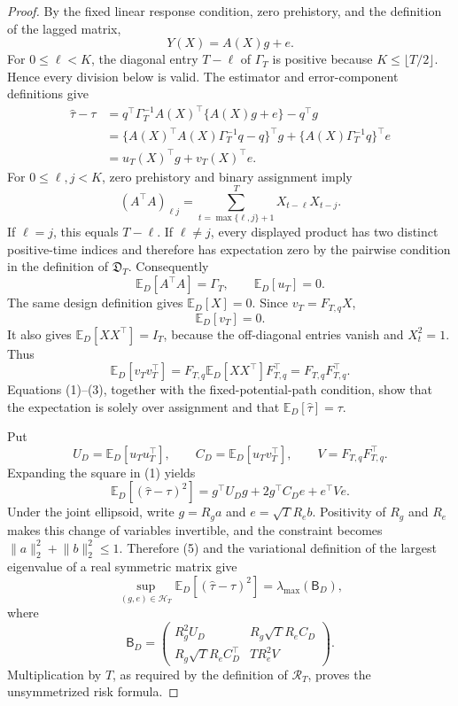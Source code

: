 \documentclass{article}
\begin{document}
\begin{proof}
By the fixed linear response condition, zero prehistory, and the definition of the lagged matrix,
\[
Y(X)=A(X)g+e.
\]
For \(0\le \ell<K\), the diagonal entry \(T-\ell\) of \(\Gamma_T\) is positive because \(K\le\lfloor T/2\rfloor\).  Hence every division below is valid.  The estimator and error-component definitions give
\[
\begin{aligned}
\widehat\tau-\tau
&=q^{\top}\Gamma_T^{-1}A(X)^{\top}\{A(X)g+e\}-q^{\top}g\\
&=\{A(X)^{\top}A(X)\Gamma_T^{-1}q-q\}^{\top}g
  +\{A(X)\Gamma_T^{-1}q\}^{\top}e\\
&=u_T(X)^{\top}g+v_T(X)^{\top}e.
\end{aligned}
\tag{1}
\]
For \(0\le \ell,j<K\), zero prehistory and binary assignment imply
\[
(A^{\top}A)_{\ell j}
=\sum_{t=\max\{\ell,j\}+1}^{T}X_{t-\ell}X_{t-j}.
\]
If \(\ell=j\), this equals \(T-\ell\).  If \(\ell\ne j\), every displayed product has two distinct positive-time indices and therefore has expectation zero by the pairwise condition in the definition of \(\mathfrak D_T\).  Consequently
\[
\mathbb E_D[A^{\top}A]=\Gamma_T,
\qquad
\mathbb E_D[u_T]=0.
\tag{2}
\]
The same design definition gives \(\mathbb E_D[X]=0\).  Since \(v_T=F_{T,q}X\),
\[
\mathbb E_D[v_T]=0.
\tag{3}
\]
It also gives \(\mathbb E_D[XX^{\top}]=I_T\), because the off-diagonal entries vanish and \(X_t^2=1\).  Thus
\[
\mathbb E_D[v_Tv_T^{\top}]
=F_{T,q}\mathbb E_D[XX^{\top}]F_{T,q}^{\top}
=F_{T,q}F_{T,q}^{\top}.
\tag{4}
\]
Equations (1)--(3), together with the fixed-potential-path condition, show that the expectation is solely over assignment and that \(\mathbb E_D[\widehat\tau]=\tau\).

Put
\[
U_D=\mathbb E_D[u_Tu_T^{\top}],
\qquad
C_D=\mathbb E_D[u_Tv_T^{\top}],
\qquad
V=F_{T,q}F_{T,q}^{\top}.
\]
Expanding the square in (1) yields
\[
\mathbb E_D[(\widehat\tau-\tau)^2]
=g^{\top}U_Dg+2g^{\top}C_De+e^{\top}Ve.
\tag{5}
\]
Under the joint ellipsoid, write \(g=R_ga\) and \(e=\sqrt T R_eb\).  Positivity of \(R_g\) and \(R_e\) makes this change of variables invertible, and the constraint becomes \(\lVert a\rVert_2^2+\lVert b\rVert_2^2\le1\).  Therefore (5) and the variational definition of the largest eigenvalue of a real symmetric matrix give
\[
\sup_{(g,e)\in\mathcal H_T}\mathbb E_D[(\widehat\tau-\tau)^2]
=\lambda_{\max}(\mathsf B_D),
\]
where
\[
\mathsf B_D=
\begin{pmatrix}
R_g^2U_D&R_g\sqrt T R_e C_D\\
R_g\sqrt T R_e C_D^{\top}&T R_e^2V
\end{pmatrix}.
\tag{6}
\]
Multiplication by \(T\), as required by the definition of \(\mathcal R_T\), proves the unsymmetrized risk formula.


\end{proof}
\end{document}
